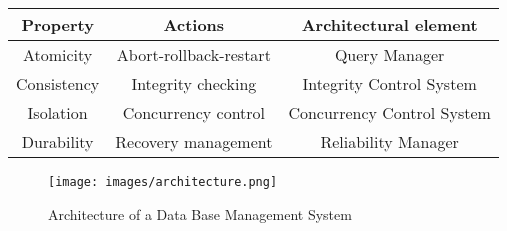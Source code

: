 \begin{table}[H]
    \centering
    \begin{tabular}{c|c|c}
    \textbf{Property} & \textbf{Actions}       & \textbf{Architectural element} \\ \hline
    Atomicity         & Abort-rollback-restart & Query Manager                  \\
    Consistency       & Integrity checking     & Integrity Control System       \\
    Isolation         & Concurrency control    & Concurrency Control System     \\
    Durability        & Recovery management    & Reliability Manager           
    \end{tabular}
\end{table}
\begin{figure}[H]
    \centering
    \texttt{[image: images/architecture.png]}
    \caption{Architecture of a Data Base Management System}
\end{figure}